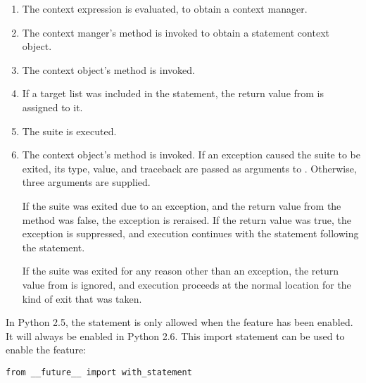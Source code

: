 \begin{enumerate}

\item The context expression is evaluated, to obtain a context manager.

\item The context manger's  method is
invoked to obtain a  statement context object.

\item The context object's  method is invoked.

\item If a target list was included in the 
statement, the return value from  is assigned to it.


\item The suite is executed.

\item The context object's  method is invoked. If
an exception caused the suite to be exited, its type, value, and
traceback are passed as arguments to . Otherwise,
three  arguments are supplied.

If the suite was exited due to an exception, and the return
value from the  method was false, the exception is
reraised. If the return value was true, the exception is suppressed, and
execution continues with the statement following the 
statement.

If the suite was exited for any reason other than an exception, the
return value from  is ignored, and execution proceeds
at the normal location for the kind of exit that was taken.

\end{enumerate}

\begin{notice}
In Python 2.5, the  statement is only allowed
when the  feature has been enabled.  It will always
be enabled in Python 2.6.  This  import statement can
be used to enable the feature:

\begin{verbatim}
from __future__ import with_statement
\end{verbatim}
\end{notice}

